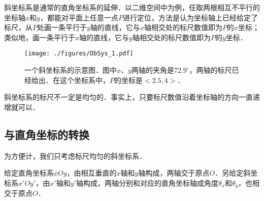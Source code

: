 

斜坐标系是通常的直角坐标系的延伸．以二维空间中为例，任取两根相互不平行的坐标轴$x$和$y$，都能对平面上任意一点$P$进行定位，方法是认为坐标轴上已经给定了标尺，从$P$处画一条平行于$y$轴的直线，它与$x$轴相交处的标尺数值即为$P$的$x$坐标；类似地，画一条平行于$x$轴的直线，它与$y$轴相交处的标尺数值即为$P$的$y$坐标．

\begin{figure}[ht]
\centering
\texttt{[image: ./figures/ObSys\_1.pdf]}
\caption{一个斜坐标系的示意图．图中$x$、$y$两轴的夹角是$72.9^\circ$，两轴的标尺已经给出．在这个坐标系中，$P$的坐标是$<2.5, 4>$．} \label{ObSys_fig1}
\end{figure}

斜坐标系的标尺不一定是均匀的．事实上，只要标尺数值沿着坐标轴的方向一直递增就可以．

\subsection{与直角坐标的转换}

为方便计，我们只考虑标尺均匀的斜坐标系．

给定直角坐标系$xOy$，由相互垂直的$x$轴和$y$轴构成，两轴交于原点$O$．另给定斜坐标系$x'Oy'$，由$x'$轴和$y'$轴构成，两轴分别和对应的直角坐标轴成角度$\theta_x$和$\theta_y$，也相交于原点$O$．

